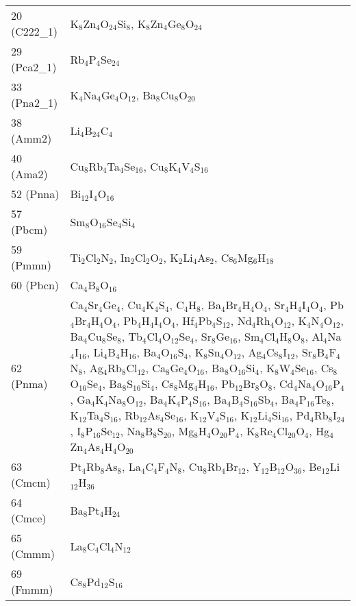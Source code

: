 {\begin{longtable}{p{7.315em}|p{40em}}
    20 (C222\_1) & K$_{8}$Zn$_{4}$O$_{24}$Si$_{8}$, K$_{8}$Zn$_{4}$Ge$_{8}$O$_{24}$ \\
    29 (Pca2\_1) & Rb$_{4}$P$_{4}$Se$_{24}$ \\
    33 (Pna2\_1) & K$_{4}$Na$_{4}$Ge$_{4}$O$_{12}$, Ba$_{8}$Cu$_{8}$O$_{20}$ \\
    38 (Amm2) & Li$_{4}$B$_{24}$C$_{4}$ \\
    40 (Ama2) & Cu$_{8}$Rb$_{4}$Ta$_{4}$Se$_{16}$, Cu$_{8}$K$_{4}$V$_{4}$S$_{16}$ \\
    52 (Pnna) & Bi$_{12}$I$_{4}$O$_{16}$ \\
    57 (Pbcm) & Sm$_{8}$O$_{16}$Se$_{4}$Si$_{4}$ \\
    59 (Pmmn) & Ti$_{2}$Cl$_{2}$N$_{2}$, In$_{2}$Cl$_{2}$O$_{2}$, K$_{2}$Li$_{4}$As$_{2}$, Cs$_{6}$Mg$_{6}$H$_{18}$ \\
    60 (Pbcn) & Ca$_{4}$B$_{8}$O$_{16}$ \\
    62 (Pnma) & Ca$_{4}$Sr$_{4}$Ge$_{4}$, Cu$_{4}$K$_{4}$S$_{4}$, C$_{4}$H$_{8}$, Ba$_{4}$Br$_{4}$H$_{4}$O$_{4}$, Sr$_{4}$H$_{4}$I$_{4}$O$_{4}$, Pb$_{4}$Br$_{4}$H$_{4}$O$_{4}$, Pb$_{4}$H$_{4}$I$_{4}$O$_{4}$, Hf$_{4}$Pb$_{4}$S$_{12}$, Nd$_{4}$Rh$_{4}$O$_{12}$, K$_{4}$N$_{4}$O$_{12}$, Ba$_{4}$Cu$_{8}$Se$_{8}$, Tb$_{4}$Cl$_{4}$O$_{12}$Se$_{4}$, Sr$_{8}$Ge$_{16}$, Sm$_{4}$Cl$_{4}$H$_{8}$O$_{8}$, Al$_{4}$Na$_{4}$I$_{16}$, Li$_{4}$B$_{4}$H$_{16}$, Ba$_{4}$O$_{16}$S$_{4}$, K$_{8}$Sn$_{4}$O$_{12}$, Ag$_{4}$Cs$_{8}$I$_{12}$, Sr$_{8}$B$_{4}$F$_{4}$N$_{8}$, Ag$_{4}$Rb$_{8}$Cl$_{12}$, Ca$_{8}$Ge$_{4}$O$_{16}$, Ba$_{8}$O$_{16}$Si$_{4}$, K$_{8}$W$_{4}$Se$_{16}$, Cs$_{8}$O$_{16}$Se$_{4}$, Ba$_{8}$S$_{16}$Si$_{4}$, Cs$_{8}$Mg$_{4}$H$_{16}$, Pb$_{12}$Br$_{8}$O$_{8}$, Cd$_{4}$Na$_{4}$O$_{16}$P$_{4}$, Ga$_{4}$K$_{4}$Na$_{8}$O$_{12}$, Ba$_{4}$K$_{4}$P$_{4}$S$_{16}$, Ba$_{4}$B$_{4}$S$_{16}$Sb$_{4}$, Ba$_{4}$P$_{16}$Te$_{8}$, K$_{12}$Ta$_{4}$S$_{16}$, Rb$_{12}$As$_{4}$Se$_{16}$, K$_{12}$V$_{4}$S$_{16}$, K$_{12}$Li$_{4}$Si$_{16}$, Pd$_{4}$Rb$_{8}$I$_{24}$, I$_{8}$P$_{16}$Se$_{12}$, Na$_{8}$B$_{8}$S$_{20}$, Mg$_{8}$H$_{4}$O$_{20}$P$_{4}$, K$_{8}$Re$_{4}$Cl$_{20}$O$_{4}$, Hg$_{4}$Zn$_{4}$As$_{4}$H$_{4}$O$_{20}$ \\
    63 (Cmcm) & Pt$_{4}$Rb$_{8}$As$_{8}$, La$_{4}$C$_{4}$F$_{4}$N$_{8}$, Cu$_{8}$Rb$_{4}$Br$_{12}$, Y$_{12}$B$_{12}$O$_{36}$, Be$_{12}$Li$_{12}$H$_{36}$ \\
    64 (Cmce) & Ba$_{8}$Pt$_{4}$H$_{24}$ \\
    65 (Cmmm) & La$_{8}$C$_{4}$Cl$_{4}$N$_{12}$ \\
    69 (Fmmm) & Cs$_{8}$Pd$_{12}$S$_{16}$ \\

\end{longtable}}
